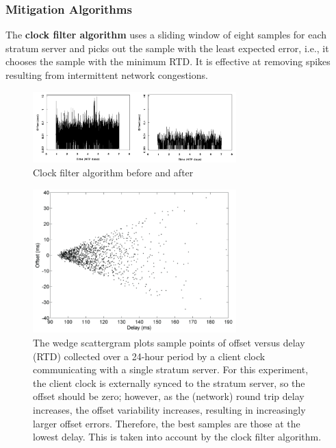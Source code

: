 \documentclass[a4paper,11pt]{article}
\begin{document}
\subsubsection{Mitigation Algorithms}
The \textbf{clock filter algorithm} uses a sliding window of eight samples for each stratum server and picks out the sample with the least expected error, i.e., it chooses the sample with the minimum RTD.
It is effective at removing spikes resulting from intermittent network congestions.

\begin{figure}[H]
    \centering
    \includegraphics[width=0.7\textwidth]{./images/clockfilteralg.png}
    \caption{ Clock filter algorithm before and after }
\end{figure}

\begin{figure}[H]
    \centering
    \includegraphics[width=0.7\textwidth]{./images/clockfilteralgmotivation.png}
    \caption{ 
        The wedge scattergram plots sample points of offset versus delay (RTD) collected over a 24-hour period by a client clock communicating with a single stratum server.
        For this experiment, the client clock is externally synced to the stratum server, so the offset should be zero;
        however, as the (network) round trip delay increases, the offset variability increases, resulting in increasingly larger offset errors.
        Therefore, the best samples are those at the lowest delay.
        This is taken into account by the clock filter algorithm.
    }
\end{figure}
\end{document}
